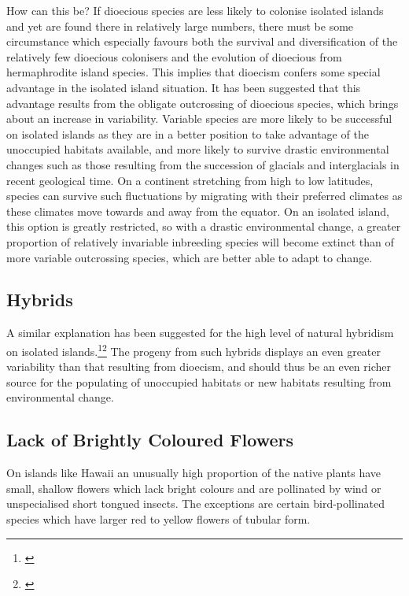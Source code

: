How can this be? If dioecious species are less likely to colonise isolated islands and yet are found there in relatively large numbers, there must be some circumstance which especially favours both the survival and diversification of the relatively few dioecious colonisers and the evolution of dioecious from hermaphrodite island species.
This implies that dioecism confers some special advantage in the isolated island situation.
It has been suggested that this advantage results from the obligate outcrossing of dioecious species, which brings about an increase in variability.
Variable species are more likely to be successful on isolated islands as they are in a better position to take advantage of the unoccupied habitats available, and more likely to survive drastic environmental changes such as those resulting from the succession of glacials and interglacials in recent geological time.
On a continent stretching from high to low latitudes, species can survive such fluctuations by migrating with their preferred climates as these climates move towards and away from the equator.
On an isolated island, this option is greatly restricted, so with a drastic environmental change, a greater proportion of relatively invariable inbreeding species will become extinct than of more variable outcrossing species, which are better able to adapt to change.

\subsection{Hybrids}

A similar explanation has been suggested for the high level of natural hybridism on isolated islands.\footnote{\cite{gillett1972role}}\footnote{\cite{rattenbury1962cyclic}} The progeny from such hybrids displays an even greater variability than that resulting from dioecism, and should thus be an even richer source for the populating of unoccupied habitats or new habitats resulting from environmental change.

\subsection{Lack of Brightly Coloured Flowers}

On islands like Hawai{\okina}i an unusually high proportion of the native plants have small, shallow flowers which lack bright colours and are pollinated by wind or unspecialised short tongued insects.
The exceptions are certain bird-pollinated species which have larger red to yellow flowers of tubular form.

